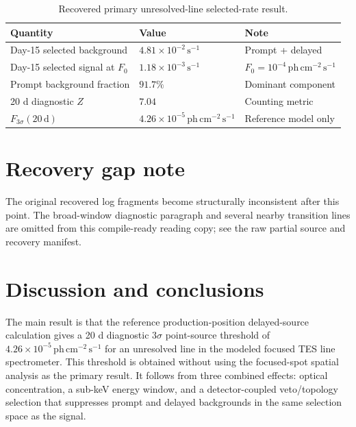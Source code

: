 \documentclass[11pt]{article}
\newcommand{\phcms}{\ensuremath{\,\mathrm{ph\,cm^{-2}\,s^{-1}}}}
\newcommand{\cps}{\ensuremath{\,\mathrm{s^{-1}}}}
\newcommand{\fzero}{F_{0}}
\newcommand{\fthree}{F_{3\sigma}}
\begin{document}
\begin{table}[h]
\centering
\caption{Recovered primary unresolved-line selected-rate result.}
\label{tab:primary_sensitivity}
\begin{tabular}{lll}
\toprule
Quantity & Value & Note \\
\midrule
Day-15 selected background & $4.81\times10^{-2}\cps$ & Prompt + delayed \\
Day-15 selected signal at $\fzero$ & $1.18\times10^{-3}\cps$ & $\fzero=10^{-4}\phcms$ \\
Prompt background fraction & $91.7\%$ & Dominant component \\
20 d diagnostic $Z$ & $7.04$ & Counting metric \\
$\fthree(20\,\mathrm{d})$ & $4.26\times10^{-5}\phcms$ & Reference model only \\
\bottomrule
\end{tabular}
\end{table}

\clearpage
\section*{Recovery gap note}
The original recovered log fragments become structurally inconsistent after this point. The broad-window diagnostic paragraph and several nearby transition lines are omitted from this compile-ready reading copy; see the raw partial source and recovery manifest.

\section{Discussion and conclusions}
\label{sec:discussion}

The main result is that the reference production-position delayed-source calculation gives a 20 d diagnostic $3\sigma$ point-source threshold of $4.26\times10^{-5}\phcms$ for an unresolved line in the modeled focused TES line spectrometer. This threshold is obtained without using the focused-spot spatial analysis as the primary result. It follows from three combined effects: optical concentration, a sub-keV energy window, and a detector-coupled veto/topology selection that suppresses prompt and delayed backgrounds in the same selection space as the signal.
\end{document}
